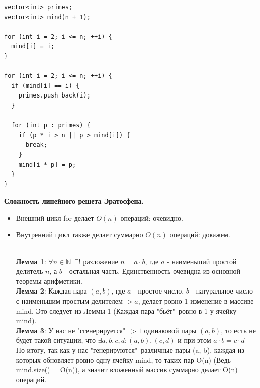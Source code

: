 \pagebreak

\begin{lstlisting}
vector<int> primes;
vector<int> mind(n + 1);

for (int i = 2; i <= n; ++i) {
  mind[i] = i;
}

for (int i = 2; i <= n; ++i) {
  if (mind[i] == i) {
    primes.push_back(i);
  }

  for (int p : primes) {
    if (p * i > n || p > mind[i]) {
      break;
    }
    mind[i * p] = p;
  }
}
\end{lstlisting}

\textbf{Сложность линейного решета Эратосфена.}

\begin{itemize}
    \item Внешний цикл for делает $O(n)$ операций: очевидно.
    \item Внутренний цикл также делает суммарно $O(n)$ операций: докажем.

    \Proof\\
    \textbf{Лемма 1}: $\forall n \in \mathbb{N}\;\; \exists!$ разложение $n = a \cdot b$, где $a$ - наименьший простой делитель $n$, а $b$ - остальная часть. Единственность очевидна из основной теоремы арифметики.\\
    \textbf{Лемма 2}: Каждая пара $(a, b)$, где $a$ - простое число, $b$ - натуральное число с наименьшим простым делителем $ > a$, делает ровно 1 изменение в массиве mind. Это следует из Леммы 1 (Каждая пара "бьёт"\ ровно в 1-у ячейку mind).\\
    \textbf{Лемма 3}: У нас не "сгенерируется"\ $> 1$ одинаковой пары $(a, b)$, то есть не будет такой ситуации, что $\exists a, b, c, d: (a, b), (c, d) \text{ и при этом } a \cdot b = c \cdot d$\\
    По итогу, так как у нас "генерируются"\ различные пары (a, b), каждая из которых обновляет ровно одну ячейку mind, то таких пар O(n) (Ведь mind.size() = O(n)), а значит вложенный массив суммарно делает O(n) операций.\\
    \Endproof
\end{itemize}



\pagebreak
